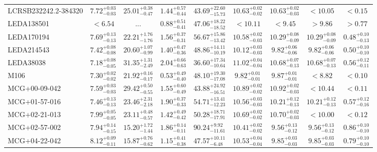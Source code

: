 \documentclass[onecolumn]{mn2e}
\begin{document}
{\begin{center}
\begin{longtable}{lcccccccc}
LCRSB232242.2-384320 & $7.72_{-0.03}^{+0.03}$ & $25.01_{-0.47}^{+0.38}$ & $1.44_{-0.44}^{+0.57}$ &$43.69_{-15.73}^{+22.60}$ & $10.63_{-0.02}^{+0.02}$ & $10.63_{-0.03}^{+0.02}$ & $<10.05$ & $<0.15$ \\
LEDA138501 & $<6.54$ & ... & $0.88_{-0.41}^{+0.51}$ &$47.06_{-18.52}^{+18.22}$ & $<10.11$ & $<9.45$ & $>9.86$ & $>0.77$ \\
LEDA170194 & $7.69_{-0.13}^{+0.13}$ & $22.21_{-1.76}^{+1.76}$ & $1.56_{-0.31}^{+0.37}$ &$56.67_{-13.42}^{+15.86}$ & $10.58_{-0.03}^{+0.02}$ & $10.29_{-0.09}^{+0.08}$ & $10.29_{-0.09}^{+0.08}$ & $0.48_{-0.13}^{+0.10}$ \\
LEDA214543 & $7.42_{-0.08}^{+0.08}$ & $20.60_{-0.99}^{+1.07}$ & $1.40_{-0.36}^{+0.47}$ &$48.86_{-10.19}^{+14.11}$ & $10.12_{-0.03}^{+0.03}$ & $9.82_{-0.06}^{+0.06}$ & $9.82_{-0.06}^{+0.06}$ & $0.50_{-0.10}^{+0.10}$ \\
LEDA38038 & $7.18_{-0.05}^{+0.08}$ & $31.35_{-2.49}^{+1.31}$ & $2.04_{-0.63}^{+0.66}$ &$36.60_{-10.64}^{+17.34}$ & $11.02_{-0.04}^{+0.04}$ & $10.68_{-0.13}^{+0.07}$ & $10.68_{-0.13}^{+0.07}$ & $0.56_{-0.11}^{+0.12}$ \\
M106 & $7.30_{-0.02}^{+0.02}$ & $21.92_{-0.17}^{+0.16}$ & $0.53_{-0.40}^{+0.49}$ &$48.10_{-17.08}^{+19.30}$ & $9.82_{-0.01}^{+0.01}$ & $9.87_{-0.01}^{+0.01}$ & $<8.82$ & $<0.10$ \\
MCG+00-09-042 & $7.59_{-0.03}^{+0.03}$ & $29.42_{-0.55}^{+0.50}$ & $1.55_{-0.49}^{+0.60}$ &$43.88_{-16.51}^{+24.92}$ & $10.89_{-0.02}^{+0.02}$ & $10.92_{-0.03}^{+0.02}$ & $<10.44$ & $<0.11$ \\
MCG+01-57-016 & $7.46_{-0.13}^{+0.13}$ & $23.46_{-2.18}^{+2.31}$ & $1.90_{-0.33}^{+0.37}$ &$54.71_{-12.23}^{+13.41}$ & $10.56_{-0.03}^{+0.03}$ & $10.21_{-0.13}^{+0.12}$ & $10.21_{-0.13}^{+0.12}$ & $0.57_{-0.16}^{+0.12}$ \\
MCG+02-21-013 & $7.99_{-0.05}^{+0.05}$ & $23.11_{-0.57}^{+0.48}$ & $1.42_{-0.42}^{+0.49}$ &$50.28_{-17.91}^{+18.71}$ & $10.69_{-0.02}^{+0.02}$ & $10.70_{-0.03}^{+0.02}$ & $<10.00$ & $<0.12$ \\
MCG+02-57-002 & $7.94_{-0.15}^{+0.14}$ & $15.20_{-1.44}^{+1.72}$ & $1.86_{-0.11}^{+0.14}$ &$90.24_{-11.61}^{+9.92}$ & $10.41_{-0.02}^{+0.02}$ & $9.56_{-0.12}^{+0.13}$ & $9.56_{-0.12}^{+0.13}$ & $0.86_{-0.10}^{+0.10}$ \\
MCG+04-22-042 & $8.12_{-0.11}^{+0.09}$ & $15.87_{-0.62}^{+0.76}$ & $1.15_{-0.38}^{+0.41}$ &$47.57_{-6.48}^{+10.11}$ & $10.53_{-0.04}^{+0.04}$ & $9.85_{-0.03}^{+0.03}$ & $9.85_{-0.03}^{+0.03}$ & $0.79_{-0.10}^{+0.10}$ \\

\end{longtable}
\end{center}}
\end{document}
